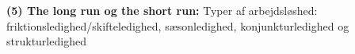 \noindent \textbf{(5) The long run og the short run:} Typer af arbejdsløshed: friktionsledighed/skifteledighed, sæsonledighed, konjunkturledighed og strukturledighed \parencite[707-725, 782-815]{Mankiw2011}



